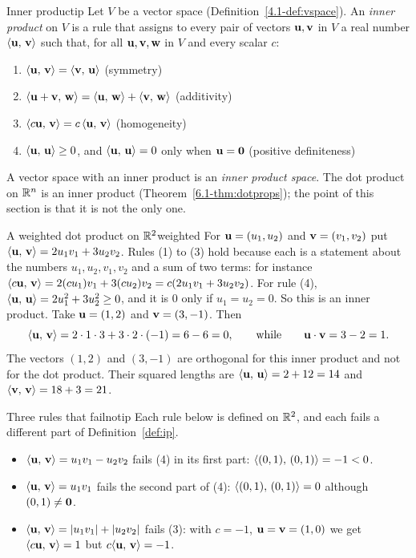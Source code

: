 \documentclass[11pt]{article}
\begin{document}
\begin{defn}{Inner product}{ip}
Let $V$ be a vector space (Definition~\ref{4.1-def:vspace}). An \emph{inner product} on $V$ is a rule that assigns to every pair of vectors $\mathbf{u},\mathbf{v}$ in $V$ a real number $\langle \mathbf{u},\,\mathbf{v}\rangle$ such that, for all $\mathbf{u},\mathbf{v},\mathbf{w}$ in $V$ and every scalar $c$:
\begin{enumerate}[label=(\arabic*),itemsep=1pt]
  \item $\langle \mathbf{u},\,\mathbf{v}\rangle=\langle \mathbf{v},\,\mathbf{u}\rangle$ \hfill (symmetry)
  \item $\langle \mathbf{u}+\mathbf{v},\,\mathbf{w}\rangle=\langle \mathbf{u},\,\mathbf{w}\rangle+\langle \mathbf{v},\,\mathbf{w}\rangle$ \hfill (additivity)
  \item $\langle c\mathbf{u},\,\mathbf{v}\rangle=c\,\langle \mathbf{u},\,\mathbf{v}\rangle$ \hfill (homogeneity)
  \item $\langle \mathbf{u},\,\mathbf{u}\rangle\ge0$, and $\langle \mathbf{u},\,\mathbf{u}\rangle=0$ only when $\mathbf{u}=\mathbf{0}$ \hfill (positive definiteness)
\end{enumerate}
A vector space with an inner product is an \emph{inner product space}. The dot product on $\mathbb{R}^n$ is an inner product (Theorem~\ref{6.1-thm:dotprops}); the point of this section is that it is not the only one.
\end{defn}

\begin{exmp}{A weighted dot product on $\mathbb{R}^2$}{weighted}
For $\mathbf{u}=(u_1,u_2)$ and $\mathbf{v}=(v_1,v_2)$ put $\langle \mathbf{u},\,\mathbf{v}\rangle=2u_1v_1+3u_2v_2$. Rules (1) to (3) hold because each is a statement about the numbers $u_1,u_2,v_1,v_2$ and a sum of two terms: for instance $\langle c\mathbf{u},\,\mathbf{v}\rangle=2(cu_1)v_1+3(cu_2)v_2=c(2u_1v_1+3u_2v_2)$. For rule (4), $\langle \mathbf{u},\,\mathbf{u}\rangle=2u_1^2+3u_2^2\ge0$, and it is $0$ only if $u_1=u_2=0$. So this is an inner product. Take $\mathbf{u}=(1,2)$ and $\mathbf{v}=(3,-1)$. Then
\[
\langle \mathbf{u},\,\mathbf{v}\rangle=2\cdot1\cdot3+3\cdot2\cdot(-1)=6-6=0,\qquad\text{while}\qquad\mathbf{u}\cdot\mathbf{v}=3-2=1 .
\]
The vectors $(1,2)$ and $(3,-1)$ are orthogonal for this inner product and not for the dot product. Their squared lengths are $\langle \mathbf{u},\,\mathbf{u}\rangle=2+12=14$ and $\langle \mathbf{v},\,\mathbf{v}\rangle=18+3=21$.
\end{exmp}

\begin{exmp}{Three rules that fail}{notip}
Each rule below is defined on $\mathbb{R}^2$, and each fails a different part of Definition~\ref{def:ip}.
\begin{itemize}
  \item $\langle \mathbf{u},\,\mathbf{v}\rangle=u_1v_1-u_2v_2$ fails (4) in its first part: $\langle (0,1),\,(0,1)\rangle=-1<0$.
  \item $\langle \mathbf{u},\,\mathbf{v}\rangle=u_1v_1$ fails the second part of (4): $\langle (0,1),\,(0,1)\rangle=0$ although $(0,1)\neq\mathbf{0}$.
  \item $\langle \mathbf{u},\,\mathbf{v}\rangle=|u_1v_1|+|u_2v_2|$ fails (3): with $c=-1$, $\mathbf{u}=\mathbf{v}=(1,0)$ we get $\langle c\mathbf{u},\,\mathbf{v}\rangle=1$ but $c\langle \mathbf{u},\,\mathbf{v}\rangle=-1$.
\end{itemize}
\end{exmp}
\end{document}
